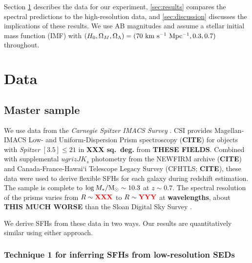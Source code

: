 \documentclass[a4paper,fleqn,usenatbib]{mnras}
\newcommand{\Msun}{{\rm M}_\odot}
\newcommand{\Mstel}{M_\ast}
\newcommand{\logM}{\log\Mstel/\Msun}
\newcommand{\bfr}{\bf\color{red}}
\newcommand{\CITE}{{\bfr CITE}}
\begin{document}
Section \ref{sec:data} describes the data for our experiment, \ref{sec:results} compares 
the spectral predictions to the high-resolution data, and \ref{sec:discussion} discusses 
the implications of these results. We use AB magnitudes and assume 
a \citet{Chabrier03} stellar initial mass function (IMF) with $(H_{0}, \Omega_{M}, \Omega_{\Lambda}) =
(70~{\rm km~s^{-1}~Mpc^{-1}}, 0.3, 0.7)$ throughout.



\section{Data}
\label{sec:data}

\subsection{Master sample}
\label{sec:master}

We use data from the {\it Carnegie Spitzer IMACS Survey} \citep[CSI;][]{Kelson14a}. CSI provides
Magellan-IMACS Low- and Uniform-Dispersion Prism spectroscopy (\CITE) for objects with {\it Spitzer} 
$[3.5]\leq21$ in {\bfr XXX sq.~deg.} from {\bfr THESE FIELDS}. Combined with supplemental 
$ugrizJK_{s}$ photometry from the NEWFIRM archive (\CITE) and Canada-France-Hawai`i Telescope 
Legacy Survey (CFHTLS; \CITE), these data were used to derive flexible SFHs for each galaxy
during redshift estimation. The sample is complete to $\logM\sim10.3$ at $z\sim0.7$.
The spectral resolution of the prisms varies from $R\sim{\bfr XXX}$ to $R\sim{\bfr YYY}$ at
{\bfr wavelengths}, about {\bfr THIS MUCH WORSE} than the Sloan Digital Sky Survey \citep{York00}.

We derive SFHs from these data in two ways. Our results are quantitatively similar
using either approach.


\subsubsection{Technique 1 for inferring SFHs from low-resolution SEDs}
\label{sec:blocks}
\end{document}
